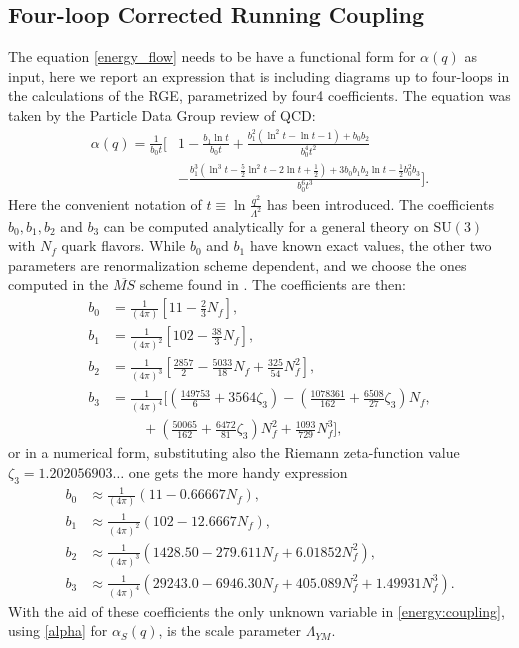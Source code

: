 \subsection{Four-loop Corrected Running Coupling}
\label{sec:4loop}
The equation \cref{energy_flow} needs to be have a functional form for $\alpha(q)$ as input, here we report an expression that is including diagrams up to four-loops in the calculations of the RGE, parametrized by four4 coefficients. The equation was taken by the Particle Data Group review of QCD\cite{dissertori_9._2016}:
\begin{align}
    \label{alpha}
    \alpha(q) = \frac{1}{b_0t} \bigg[& 1 - \frac{b_1\ln t}{b_0t}  + \frac{b_1^2(\ln^2t - \ln t - 1) + b_0b_2}{b_0^4t^2}\\\nonumber
    & - \frac{b_1^3(\ln^3t - \frac{5}{2}\ln^2 t - 2\ln t + \frac{1}{2}) + 3b_0b_1b_2\ln t - \frac{1}{2}b_0^2b_3}{b_0^6t^3}\bigg].
\end{align}
Here the convenient notation of $t\equiv\ln\frac{q^2}{\Lambda^2}$ has been introduced. The coefficients $b_0, b_1,b_2$ and $b_3$ can be computed analytically for a general theory on $\mathrm{SU}(3)$ with $N_f$ quark flavors. While $b_0$ and $b_1$ have known exact values, the other two parameters are renormalization scheme dependent, and we choose the ones computed in the $\overline{MS}$ scheme found in \cite{van_ritbergen_four-loop_1997}. The coefficients are then: 
\begin{align}
    b_0 &= \frac{1}{(4\pi)}   \left[11 - \frac{2}{3}N_f\right], \\\nonumber
    b_1 &= \frac{1}{(4\pi)^2} \left[102 - \frac{38}{3}N_f\right] ,\\\nonumber
    b_2 &= \frac{1}{(4\pi)^3} \left[\frac{2857}{2} - \frac{5033}{18}N_f + \frac{325}{54}N_f^2\right] ,\\\nonumber
    b_3 &= \frac{1}{(4\pi)^4} \bigg[\left(\frac{149753}{6} + 3564\zeta_3\right)  - \left(\frac{1078361}{162}+ \frac{6508}{27}\zeta_3\right) N_f , \\\nonumber
    & ~~~~~~~~~~+ \left(\frac{50065}{162}  + \frac{6472}{81}\zeta_3\right)N_f^2 + \frac{1093}{729}N_f^3 \bigg], 
\end{align} 
or in a numerical form, substituting also the Riemann zeta-function value $\zeta_3 = 1.202056903\dots$ one gets the more handy expression
\begin{align}
    \label{b:coeffs}
    b_0 &\approx \frac{1}{(4\pi)} (11-0.66667N_f),\\\nonumber
    b_1 &\approx \frac{1}{(4\pi)^2} (102-12.6667N_f),\\\nonumber
    b_2 &\approx \frac{1}{(4\pi)^3} (1428.50-279.611N_f+ 6.01852N_f^2),\\\nonumber
    b_3 &\approx \frac{1}{(4\pi)^4} (29243.0-6946.30N_f+ 405.089N_f^2+ 1.49931N_f^3).
\end{align}
With the aid of these coefficients the only unknown variable in \cref{energy:coupling}, using \cref{alpha} for $\alpha_S(q)$, is the scale parameter $\Lambda_{YM}$.